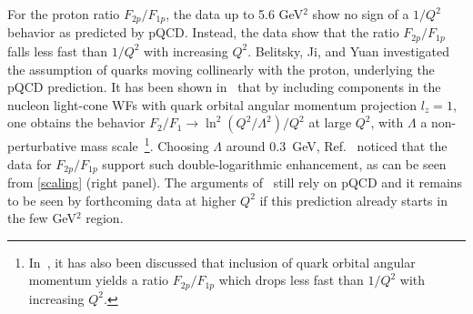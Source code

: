 For the proton ratio $F_{2 p}/F_{1 p}$, the data up to 5.6 GeV$^2$ show 
no sign of a $1/Q^2$ behavior as predicted by pQCD. 
Instead, the data show that the ratio $F_{2 p}/F_{1 p}$ falls less 
fast than $1/Q^2$ with increasing $Q^2$.
Belitsky, Ji, and Yuan \cite{Belitsky:2002kj} investigated the 
assumption of quarks moving collinearly with the proton, 
underlying the pQCD prediction. 
It has been shown in~\cite{Belitsky:2002kj} that by 
including components in the nucleon light-cone WFs with quark 
orbital angular momentum projection $l_z = 1$, one obtains 
the behavior $F_2/F_1 \to \ln^2 (Q^2 / \Lambda^2)/ Q^2$ at large $Q^2$, 
with $\Lambda$ a non-perturbative mass 
scale~\footnote{In~\cite{jain,Brodsky:2003pw}, 
it has also been discussed that inclusion
  of quark orbital angular momentum yields a ratio $F_{2p}/F_{1p}$ which drops
  less fast than $1/Q^2$ with increasing $Q^2$.  
}. 
Choosing $\Lambda$ around 
$0.3$~GeV, Ref.~\cite{Belitsky:2002kj} noticed that the 
data for $F_{2 p}/F_{1 p}$ support such double-logarithmic enhancement, as 
can be seen from \ref{scaling} (right panel). 
The arguments of~\cite{Belitsky:2002kj} 
still rely on pQCD and it remains to be seen by 
forthcoming data at higher $Q^2$ if this prediction already starts in the 
few GeV$^2$ region. 
%
